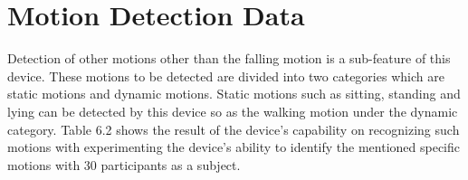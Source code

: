 \section{Motion Detection Data}

Detection of other motions other than the falling motion is a sub-feature of this device. These motions to be detected are divided into two categories which are static motions and dynamic motions. Static motions such as sitting, standing and lying can be detected by this device so as the walking motion under the dynamic category. Table 6.2 shows the result of the device's capability on recognizing such motions with experimenting the device’s ability to identify the mentioned specific motions with 30 participants as a subject.

